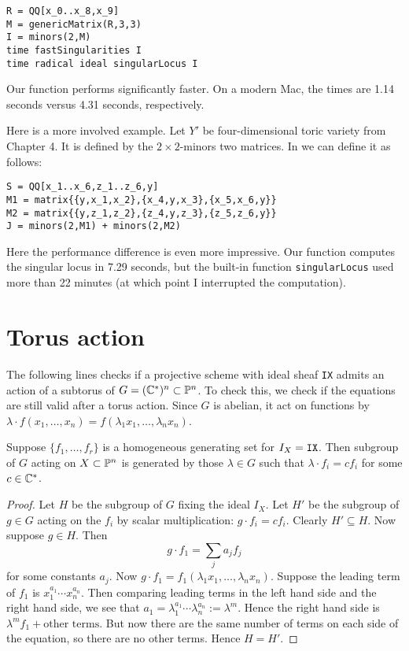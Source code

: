 \begin{lstlisting}[language=Macaulay2]
R = QQ[x_0..x_8,x_9]
M = genericMatrix(R,3,3)
I = minors(2,M)
time fastSingularities I
time radical ideal singularLocus I
\end{lstlisting}

Our function performs significantly faster. On a modern Mac, the times are 1.14 seconds versus 4.31 seconds, respectively.

Here is a more involved example. Let $Y'$ be four-dimensional toric variety from Chapter 4. It is defined by the $2 \times 2$-minors two matrices. In \MM we can define it as follows:
\begin{lstlisting}[language=Macaulay2]
S = QQ[x_1..x_6,z_1..z_6,y]
M1 = matrix{{y,x_1,x_2},{x_4,y,x_3},{x_5,x_6,y}}
M2 = matrix{{y,z_1,z_2},{z_4,y,z_3},{z_5,z_6,y}}
J = minors(2,M1) + minors(2,M2)
\end{lstlisting}

Here the performance difference is even more impressive. Our function computes the singular locus in 7.29 seconds, but the built-in function \texttt{singularLocus} used more than 22 minutes (at which point I interrupted the computation).

\section{Torus action}

The following lines checks if a projective scheme with ideal sheaf \texttt{IX} admits an action of a subtorus of $G=(\C^\ast)^n \subset \P^n$. To check this, we check if the equations are still valid after a torus action. Since $G$ is abelian, it act on functions by $\lambda \cdot f(x_1,\ldots,x_n)=f(\lambda_1 x_1, \ldots, \lambda_n x_n)$. 


\begin{lemma}
Suppose $\{ f_1,\ldots, f_r \}$ is a homogeneous generating set for $I_X=\text{\texttt{IX}}$. Then subgroup of $G$ acting on $X \subset \P^n$ is generated by those $\lambda \in G$ such that $\lambda \cdot f_i  = c f_i$ for some $c \in \C^\ast$.
\end{lemma}
\begin{proof}
Let $H$ be the subgroup of $G$ fixing the ideal $I_X$. Let $H'$ be the subgroup of $g \in G$ acting on the $f_i$ by scalar multiplication: $g \cdot f_i =c f_i$. Clearly $H' \subseteq H$.  Now suppose $g \in H$. Then
$$
g \cdot f_1 = \sum_j a_j f_j
$$
for some constants $a_j$. Now $g \cdot f_1 = f_1(\lambda_1 x _1 ,\ldots, \lambda_n x_n)$. Suppose the leading term of $f_1$ is $x_1^{a_1}\cdots x_n^{a_n}$. Then comparing leading terms in the left hand side and the right hand side, we see that $a_1 = \lambda_1^{a_1}\cdots \lambda_n^{a_n} := \lambda^m$. Hence the right hand side is $\lambda^m f_1 + \text{other terms}$. But now there are the same number of terms on each side of the equation, so there are no other terms. Hence $H=H'$. 
\end{proof}

